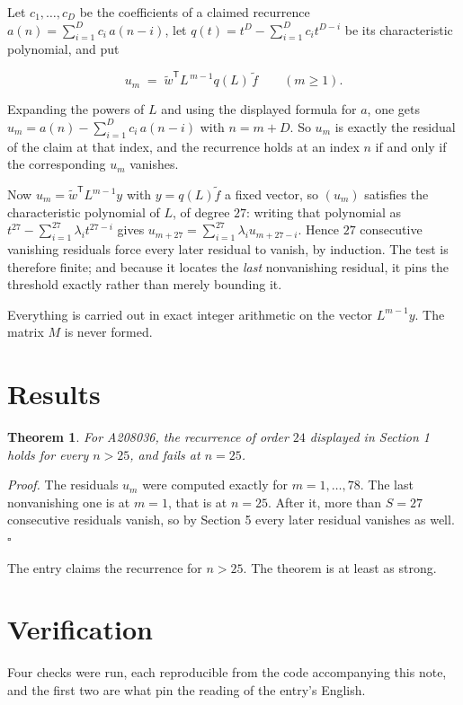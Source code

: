 \documentclass[11pt]{article}
\newtheorem{theorem}{Theorem}
\theoremstyle{definition}
\begin{document}
Let $c_1,\dots,c_D$ be the coefficients of a claimed recurrence $a(n) = \sum_{i=1}^{D} c_i\,a(n-i)$, let $q(t) = t^{D} - \sum_{i=1}^{D} c_i t^{D-i}$ be its characteristic polynomial, and put

\[u_m \;=\; \tilde w^{\mathsf T} L^{\,m-1} q(L)\,\tilde f \qquad (m \ge 1).\]

Expanding the powers of $L$ and using the displayed formula for $a$, one gets $u_m = a(n) - \sum_{i=1}^{D} c_i\,a(n-i)$ with $n = m + D$. So $u_m$ is exactly the residual of the claim at that index, and the recurrence holds at an index $n$ if and only if the corresponding $u_m$ vanishes.

Now $u_m = \tilde w^{\mathsf T} L^{m-1} y$ with $y = q(L)\tilde f$ a fixed vector, so $(u_m)$ satisfies the characteristic polynomial of $L$, of degree $27$: writing that polynomial as $t^{27} - \sum_{i=1}^{27} \lambda_i t^{27-i}$ gives $u_{m+27} = \sum_{i=1}^{27} \lambda_i u_{m+27-i}$. Hence $27$ consecutive vanishing residuals force every later residual to vanish, by induction. The test is therefore finite; and because it locates the {\itshape last} nonvanishing residual, it pins the threshold exactly rather than merely bounding it.

Everything is carried out in exact integer arithmetic on the vector $L^{m-1}y$. The matrix $M$ is never formed.

\section{Results}

\begin{theorem} For A208036, the recurrence of order $24$ displayed in Section 1 holds for every $n > 25$, and fails at $n = 25$.\end{theorem}

{\itshape Proof.} The residuals $u_m$ were computed exactly for $m = 1,\dots,78$. The last nonvanishing one is at $m = 1$, that is at $n = 25$. After it, more than $S = 27$ consecutive residuals vanish, so by Section 5 every later residual vanishes as well. $\square$

The entry claims the recurrence for $n > 25$. The theorem is at least as strong.

\section{Verification}

Four checks were run, each reproducible from the code accompanying this note, and the first two are what pin the reading of the entry's English.
\end{document}
